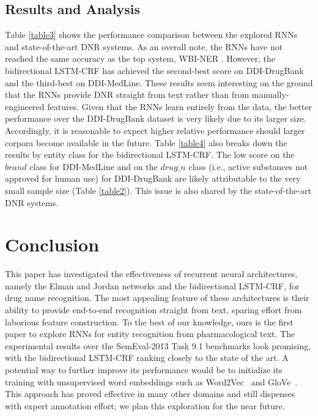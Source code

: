 \documentclass[11pt,letterpaper]{article}
\begin{document}
\subsection{Results and Analysis}
\label{ssec:results and analysis}
Table \ref{table3} shows the performance comparison between the explored RNNs and state-of-the-art DNR systems. As an overall note, the RNNs have not reached the same accuracy as the top system, WBI-NER \cite{huber2013wbi}. However, the bidirectional LSTM-CRF has achieved the second-best score on DDI-DrugBank and the third-best on DDI-MedLine. These results seem interesting on the ground that the RNNs provide DNR straight from text rather than from manually-engineered features. Given that the RNNs learn entirely from the data, the better performance over the DDI-DrugBank dataset is very likely due to its larger size. Accordingly, it is reasonable to expect higher relative performance should larger corpora become available in the future. Table \ref{table4} also breaks down the results by entity class for the bidirectional LSTM-CRF. The low score on the $brand$ class for DDI-MedLine and on the $drug\_n$ class (i.e., active substances not approved for human use) for DDI-DrugBank  are likely attributable to the very small sample size (Table \ref{table2}). This issue is also shared by the state-of-the-art DNR systems.

\section{Conclusion}
\label{sec:blind}
This paper has investigated the effectiveness of recurrent neural architectures, namely the Elman and Jordan networks and the bidirectional LSTM-CRF, for drug name recognition. The most appealing feature of these architectures is their ability to provide end-to-end recognition straight from text, sparing effort from laborious feature construction. To the best of our knowledge, ours is the first paper to explore RNNs for entity recognition from pharmacological text. The experimental results over the SemEval-2013 Task 9.1 benchmarks look promising, with the bidirectional LSTM-CRF ranking closely to the state of the art. A potential way to  further improve its performance would be to initialize its training with unsupervised word embeddings such as Word2Vec~\cite{Mikolov:13} and GloVe~\cite{Pennington:14}. This approach has proved effective in many other domains and still dispenses with expert annotation effort; we plan this exploration for the near future.

\newpage

\end{document}
